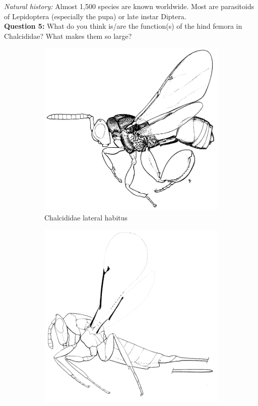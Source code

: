 \documentclass[letterpaper, 11pt]{article}
\begin{document}
\noindent{}\textit{Natural history:} Almost 1,500 species are known worldwide. Most are parasitoids of Lepidoptera (especially the pupa) or late instar Diptera.\\

\noindent{}\textbf{Question 5:} What do you think is/are the function(s) of the hind femora in Chalcididae? What makes them so large?\\

\begin{figure}[ht!]
  \centering
\begin{subfigure}[ht!]{0.45\textwidth}
    \includegraphics[width=\textwidth]{ChalcididHabitus}
  \caption{Chalcididae lateral habitus \citep[][Fig. 212]{goulet1993hymenoptera}}
  \label{fig:chalcidid}
\end{subfigure}
    \hfill
\begin{subfigure}[ht!]{0.45\textwidth}
    \includegraphics[width=\textwidth]{EulophidHabitus}

\end{subfigure}
\end{figure}
\end{document}
